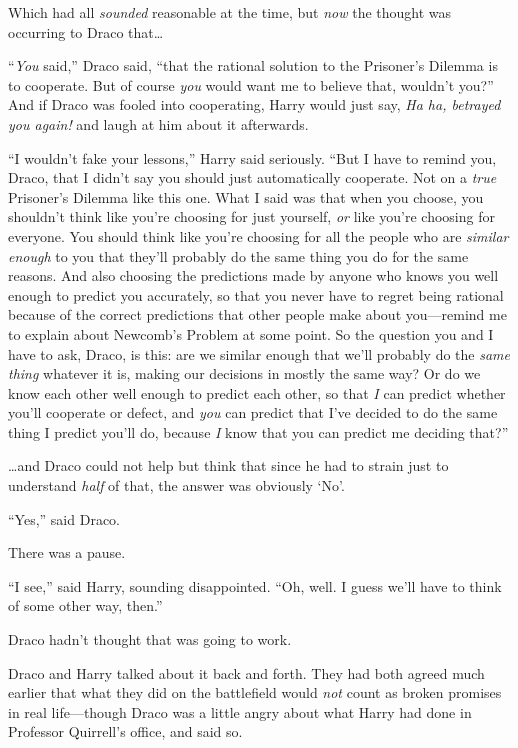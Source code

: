 Which had all \emph{sounded} reasonable at the time, but \emph{now} the thought was occurring to Draco that…

“\emph{You} said,” Draco said, “that the rational solution to the Prisoner’s Dilemma is to cooperate. But of course \emph{you} would want me to believe that, wouldn’t you?” And if Draco was fooled into cooperating, Harry would just say, \emph{Ha ha, betrayed you again!} and laugh at him about it afterwards.

“I wouldn’t fake your lessons,” Harry said seriously. “But I have to remind you, Draco, that I didn’t say you should just automatically cooperate. Not on a \emph{true} Prisoner’s Dilemma like this one. What I said was that when you choose, you shouldn’t think like you’re choosing for just yourself, \emph{or} like you’re choosing for everyone. You should think like you’re choosing for all the people who are \emph{similar enough} to you that they’ll probably do the same thing you do for the same reasons. And also choosing the predictions made by anyone who knows you well enough to predict you accurately, so that you never have to regret being rational because of the correct predictions that other people make about you—remind me to explain about Newcomb’s Problem at some point. So the question you and I have to ask, Draco, is this: are we similar enough that we’ll probably do the \emph{same thing} whatever it is, making our decisions in mostly the same way? Or do we know each other well enough to predict each other, so that \emph{I} can predict whether you’ll cooperate or defect, and \emph{you} can predict that I’ve decided to do the same thing I predict you’ll do, because \emph{I} know that you can predict me deciding that?”

…and Draco could not help but think that since he had to strain just to understand \emph{half} of that, the answer was obviously ‘No’.

“Yes,” said Draco.

There was a pause.

“I see,” said Harry, sounding disappointed. “Oh, well. I guess we’ll have to think of some other way, then.”

Draco hadn’t thought that was going to work.

Draco and Harry talked about it back and forth. They had both agreed much earlier that what they did on the battlefield would \emph{not} count as broken promises in real life—though Draco was a little angry about what Harry had done in Professor Quirrell’s office, and said so.

